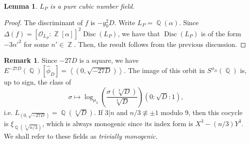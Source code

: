 \documentclass[oneside]{amsart}
\newcommand{\scprod}[1]{\left\langle #1 \right\rangle}
\newcommand{\embrace}[3]{\left#1 #3 \right#2}
\newcommand{\lpar}[1]{\embrace{(}{)}{#1}}
\DeclareMathOperator{\disc}{Disc}
\DeclareMathOperator{\QQ}{\mathbb{Q}}
\DeclareMathOperator{\ZZ}{\mathbb{Z}}
\newtheorem{lemma}[X]{Lemma}
\theoremstyle{definition}
\newtheorem{remark}[X]{Remark}
\begin{document}
\begin{lemma}
    \label{lemma: cocycle pure field}
    $L_P$ is a pure cubic number field.
\end{lemma}
\begin{proof}
    The discriminant of $f$ is $-y_0^2D$. Write $L_P = \QQ(\alpha)$. Since $\Delta(f) = [\mathcal{O}_{L_P}:\ZZ[\alpha]]^2\disc(L_P)$, we have that $\disc(L_P)$ is of the form $-3n'^2$ for some $n' \in \ZZ$. Then, the result follows from the previous discussion.
\end{proof}
\begin{remark}
    \label{remark: Trivially mono}
    Since $-27D$ is a square, we have $E^{-27D}(\QQ)[\hat{\phi}_D] = \scprod{(0, \sqrt{-27D})}$. The image of this orbit in $S^{\phi_D}(\QQ)$ is, up to sign, the class of  
    $$
    \sigma \mapsto \log_{\mu_3}\lpar{\frac{\sigma(\sqrt[3]{D})}{\sqrt[3]{D}}}(0:\sqrt{D}:1), 
    $$
    i.e. $L_{(0, \sqrt{-27D})} = \QQ(\sqrt[3]{D})$. If $3|n$ and $n/3 \not \equiv \pm 1$ modulo 9, then this cocycle is $\xi_{\QQ(\sqrt[3]{n/3})}$, which is always monogenic since its index form is $X^3 - (n/3)Y^3$. We shall refer to these fields as \textit{trivially monogenic}.
\end{remark}
\end{document}
